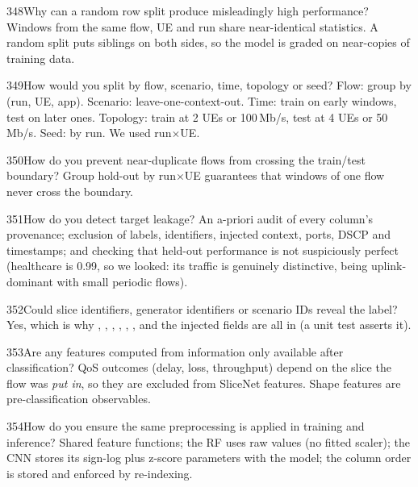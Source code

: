 \begin{qa}{348}{Why can a random row split produce misleadingly high performance?}
Windows from the same flow, UE and run share near-identical statistics. A random split puts siblings on both sides, so
the model is graded on near-copies of training data.
\end{qa}

\begin{qa}{349}{How would you split by flow, scenario, time, topology or seed?}
Flow: group by (run, UE, app). Scenario: leave-one-context-out. Time: train on early windows, test on later ones.
Topology: train at 2 UEs or 100\,Mb/s, test at 4 UEs or 50\,Mb/s. Seed: by run. We used run$\times$UE.
\end{qa}

\begin{qa}{350}{How do you prevent near-duplicate flows from crossing the train/test boundary?}
Group hold-out by run$\times$UE guarantees that windows of one flow never cross the boundary.
\end{qa}

\begin{qa}{351}{How do you detect target leakage?}
An a-priori audit of every column's provenance; exclusion of labels, identifiers, injected context, ports, DSCP and
timestamps; and checking that held-out performance is not suspiciously perfect (healthcare is 0.99, so we looked: its
traffic is genuinely distinctive, being uplink-dominant with small periodic flows).
\end{qa}

\begin{qa}{352}{Could slice identifiers, generator identifiers or scenario IDs reveal the label?}
Yes, which is why , , , ,
, ,  and the injected fields are all in 
(a unit test asserts it).
\end{qa}

\begin{qa}{353}{Are any features computed from information only available after classification?}
QoS outcomes (delay, loss, throughput) depend on the slice the flow was \emph{put in}, so they are excluded from
SliceNet features. Shape features are pre-classification observables.
\end{qa}

\begin{qa}{354}{How do you ensure the same preprocessing is applied in training and inference?}
Shared feature functions; the RF uses raw values (no fitted scaler); the CNN stores its sign-log plus z-score
parameters with the model; the column order is stored and enforced by re-indexing.
\end{qa}

